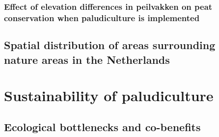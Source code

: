 \documentclass[12pt,a4paper,titlepage]{article}
\begin{document}

\subsubsection{Effect of elevation differences in peilvakken on peat conservation when paludiculture is implemented} 




%

\subsection{Spatial distribution of areas surrounding nature areas in the Netherlands}

\section{Sustainability of paludiculture}



\subsection{Ecological bottlenecks and co-benefits}
\end{document}
